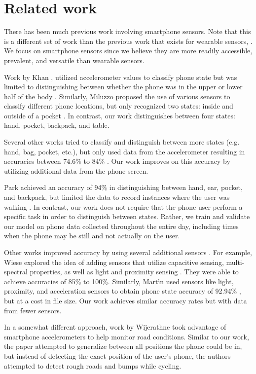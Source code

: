 \section{Related work}
There has been much previous work involving smartphone sensors.
Note that this is a different set of work than the previous work that exists for wearable sensors, \cite{Kunze2005,Atallah}.
We focus on smartphone sensors since we believe they are more readily accessible, prevalent, and versatile than wearable sensors.

Work by Khan \et, utilized accelerometer values to classify phone state 
but was limited to distinguishing between whether the phone was in the upper or lower half of the body \cite{Khan2010}.
Similarly, Miluzzo \et proposed the use of various sensors to classify different phone locations, 
but only recognized two states: inside and outside of a pocket \cite{Miluzzo2010}.
In contrast, our work distinguishes between four states: hand, pocket, backpack, and table. 

Several other works tried to classify and distinguish between more states (e.g. hand, bag, pocket, etc.), but only used data from the accelerometer resulting in accuracies between 74.6\% to 84\% \cite{Fujinami2013,Coksun15}. 
Our work improves on this accuracy by utilizing additional data from the phone screen.

Park \et achieved an accuracy of 94\% in distinguishing between hand, ear, pocket, and backpack, but limited the data to record instances where the user was walking \cite{Park2012}. 
In contrast, our work does not require that the phone user perform a specific task in order to distinguish between states.
Rather, we train and validate our model on phone data collected throughout the entire day, 
 including times when the phone may be still and not actually on the user. 

Other works improved accuracy by using several additional sensors \cite{Yang13}.
For example, Wiese \et explored the idea of adding sensors that utilize capacitive sensing,  multi-spectral properties, as well as light and proximity sensing \cite{Wiese2013}.
They were able to achieve accuracies of 85\% to 100\%.
Similarly, Mart\'{\i}n \et used sensors like light, proximity, and acceleration sensors
to obtain phone state accuracy of 92.94\% \cite{Martin2013}, but at a cost in file size.
Our work achieves similar accuracy rates but with data from fewer sensors.  

In a somewhat different approach, work by Wijerathne \et \cite{Wijerathne} took advantage of smartphone accelerometers to help monitor road conditions. Similar to our work, the paper attempted to generalize between all positions the phone could be in, but instead of detecting the exact position of the user's phone, the authors attempted to detect rough roads and bumps while cycling. 

